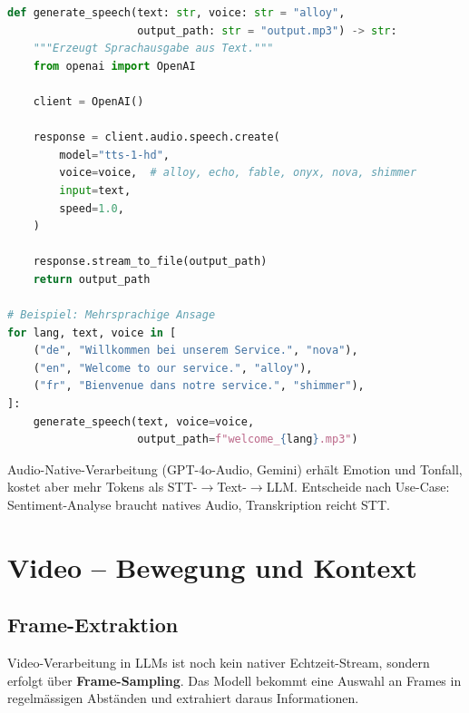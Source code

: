 \begin{lstlisting}[language=Python, caption=TTS mit mehreren Stimmen]
def generate_speech(text: str, voice: str = "alloy",
                    output_path: str = "output.mp3") -> str:
    """Erzeugt Sprachausgabe aus Text."""
    from openai import OpenAI

    client = OpenAI()

    response = client.audio.speech.create(
        model="tts-1-hd",
        voice=voice,  # alloy, echo, fable, onyx, nova, shimmer
        input=text,
        speed=1.0,
    )

    response.stream_to_file(output_path)
    return output_path

# Beispiel: Mehrsprachige Ansage
for lang, text, voice in [
    ("de", "Willkommen bei unserem Service.", "nova"),
    ("en", "Welcome to our service.", "alloy"),
    ("fr", "Bienvenue dans notre service.", "shimmer"),
]:
    generate_speech(text, voice=voice,
                    output_path=f"welcome_{lang}.mp3")
\end{lstlisting}

\begin{praxishinweis}
Audio-Native-Verarbeitung (GPT-4o-Audio, Gemini) erhält Emotion und Tonfall, kostet aber mehr Tokens als STT-$\rightarrow$Text-$\rightarrow$LLM. Entscheide nach Use-Case: Sentiment-Analyse braucht natives Audio, Transkription reicht STT.
\end{praxishinweis}

\section{Video -- Bewegung und Kontext}

\subsection{Frame-Extraktion}

Video-Verarbeitung in LLMs ist noch kein nativer Echtzeit-Stream, sondern erfolgt über \textbf{Frame-Sampling}. Das Modell bekommt eine Auswahl an Frames in regelmässigen Abständen und extrahiert daraus Informationen.

